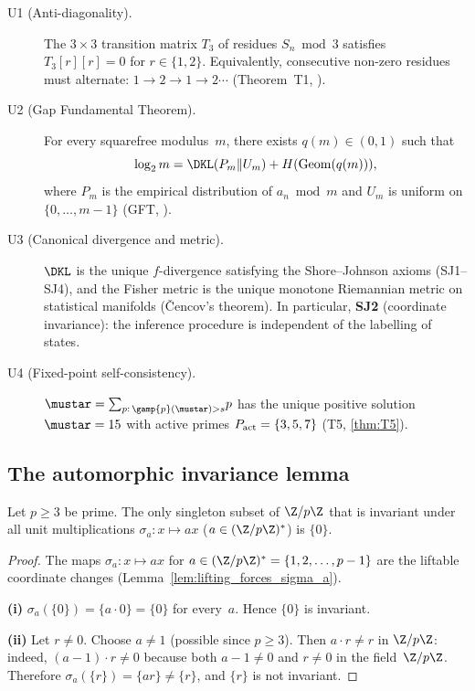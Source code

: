 \documentclass[12pt,a4paper]{article}
\begin{document}
\begin{description}
\item[U1 (Anti-diagonality).]
  The $3 \times 3$ transition matrix $T_3$ of residues $S_n \bmod 3$
  satisfies $T_3[r][r] = 0$ for $r \in \{1, 2\}$. Equivalently,
  consecutive non-zero residues must alternate: $1 \to 2 \to 1 \to 2
  \cdots$ (Theorem~T1, \cite{companion_M1}).

\item[U2 (Gap Fundamental Theorem).]
  For every squarefree modulus~$m$, there exists $q(m) \in (0,1)$ such that
  \begin{equation}
    \log_2 m = \DKL(P_m \| U_m) + H(\mathrm{Geom}(q(m))),
    \label{eq:GFT_ch25}
  \end{equation}
  where $P_m$ is the empirical distribution of $a_n \bmod m$ and $U_m$
  is uniform on $\{0, \ldots, m-1\}$ (GFT, \cite{companion_M1}).

\item[U3 (Canonical divergence and metric).]
  $\DKL$ is the unique $f$-divergence satisfying the Shore--Johnson axioms
  (SJ1--SJ4), and the Fisher metric is the unique monotone Riemannian
  metric on statistical manifolds (\v{C}encov's theorem). In particular,
  \textbf{SJ2} (coordinate invariance): the inference procedure is
  independent of the labelling of states.

\item[U4 (Fixed-point self-consistency).]
  $\mustar = \sum_{p:\, \gamp{p}(\mustar) > s}\! p$ has the unique
  positive solution $\mustar = 15$ with active primes
  $P_{\rm act} = \{3, 5, 7\}$ (T5, \cref{thm:T5}).
\end{description}

\subsection{The automorphic invariance lemma}
\label{sec:ch25_aut_lemma}

\begin{lemma}
\label{lem:aut_invariance}
Let $p \geq 3$ be prime. The only singleton subset of $\Z/p\Z$
that is invariant under all unit multiplications
$\sigma_a : x \mapsto ax$ ($a \in (\Z/p\Z)^*$) is $\{0\}$.
\end{lemma}

\begin{proof}
The maps $\sigma_a : x \mapsto ax$ for
$a \in (\Z/p\Z)^* = \{1, 2, \ldots, p-1\}$ are the liftable
coordinate changes (Lemma~\ref{lem:lifting_forces_sigma_a}).

\textbf{(i)} $\sigma_a(\{0\}) = \{a \cdot 0\} = \{0\}$ for every~$a$.
Hence $\{0\}$ is invariant.

\textbf{(ii)} Let $r \neq 0$. Choose $a \neq 1$ (possible since $p \geq 3$).
Then $a \cdot r \neq r$ in $\Z/p\Z$: indeed, $(a - 1) \cdot r \neq 0$
because both $a - 1 \neq 0$ and $r \neq 0$ in the field~$\Z/p\Z$.
Therefore $\sigma_a(\{r\}) = \{ar\} \neq \{r\}$, and $\{r\}$ is
not invariant.
\end{proof}
\end{document}
